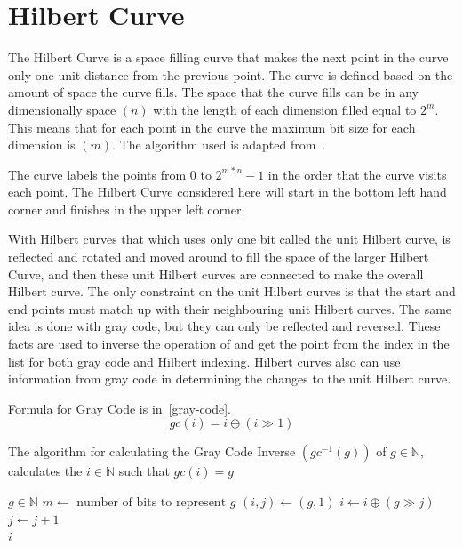 \documentclass[10pt]{article}
\begin{document}
\section{Hilbert Curve}

The Hilbert Curve is a space filling curve that makes the next point in the curve only one unit distance from the previous point. The curve is defined based on the amount of space the curve fills. The space that the curve fills can be in any dimensionally space $(n)$ with the length of each dimension filled equal to $2^m$. This means that for each point in the curve the maximum bit size for each dimension is $(m)$. The algorithm used is adapted from~\cite{Hamilton:2006}. 

The curve labels the points from $0$ to $2^{m*n} - 1$ in the order that the curve visits each point. The Hilbert Curve considered here will start in the bottom left hand corner and finishes in the upper left corner. 

With Hilbert curves that which uses only one bit called the unit Hilbert curve, is reflected and rotated and moved around to fill the space of the larger Hilbert Curve, and then these unit Hilbert curves are connected to make the overall Hilbert curve. The only constraint on the unit Hilbert curves is that the start and end points must match up with their neighbouring unit Hilbert curves. The same idea is done with gray code, but they  can only be reflected and reversed. These facts are used to inverse the operation of and get the point from the index in the list for both gray code and Hilbert indexing. Hilbert curves also can use information from gray code in determining the changes to the unit Hilbert curve.
 

\flushleft
Formula for Gray Code is in~\ref{gray-code}.
\begin{equation}
  \label{gray-code}
  gc(i) = i \oplus \left( i \gg 1 \right) 
\end{equation}

\begin{algorithm}
  \caption{The algorithm for calculating the Gray Code Inverse $(gc^{-1}(g))$ of $g \in \mathbb{N}$, calculates the $i \in \mathbb{N}$ such that $gc\left( i \right) = g $ }
  \label{gray-code-inverse}
  \begin{algorithmic}[1]
    \Require $g \in \mathbb{N}$ 
    \State $ m \leftarrow \text{ number of bits to represent } g$ 
    \State $ \left( i, j \right) \leftarrow \left( g, 1 \right) $ 
    \State $ i \leftarrow i \oplus \left( g \gg j \right)$ 
    \State $ j \leftarrow j + 1$ 
    \EndWhile \\
    \Return $i$ %
  \end{algorithmic}
\end{algorithm}
\end{document}

